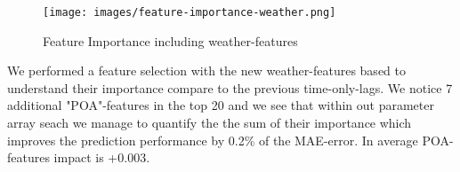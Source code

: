 \begin{figure}[H]
    \centering
    \texttt{[image: images/feature-importance-weather.png]}
    \caption{Feature Importance including weather-features}
    \label{fig:feature-importance-weather}
\end{figure}

We performed a feature selection with the new weather-features based to understand their importance 
compare to the previous time-only-lags. We notice 7 additional "POA"-features in the top 20 and we see 
that within out parameter array seach we manage to quantify the the sum of their importance which 
improves the prediction performance by 0.2\% of the MAE-error. In average POA-features impact is +0.003.





